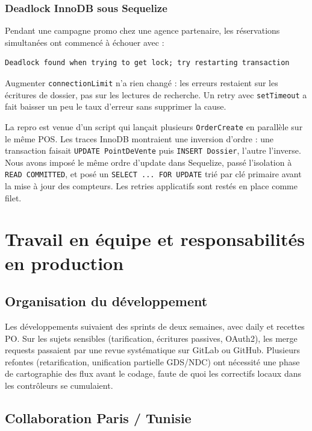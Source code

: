 \subsection{Deadlock InnoDB sous Sequelize}

Pendant une campagne promo chez une agence partenaire, les réservations simultanées ont commencé à échouer avec :
\begin{verbatim}
Deadlock found when trying to get lock; try restarting transaction
\end{verbatim}

Augmenter \texttt{connectionLimit} n'a rien changé : les erreurs restaient sur les écritures de dossier, pas sur les lectures de recherche. Un retry avec \texttt{setTimeout} a fait baisser un peu le taux d'erreur sans supprimer la cause.

La repro est venue d'un script qui lançait plusieurs \texttt{OrderCreate} en parallèle sur le même POS. Les traces InnoDB montraient une inversion d'ordre : une transaction faisait \texttt{UPDATE PointDeVente} puis \texttt{INSERT Dossier}, l'autre l'inverse. Nous avons imposé le même ordre d'update dans Sequelize, passé l'isolation à \texttt{READ COMMITTED}, et posé un \texttt{SELECT ... FOR UPDATE} trié par clé primaire avant la mise à jour des compteurs. Les retries applicatifs sont restés en place comme filet.

\chapter{Travail en équipe et responsabilités en production}
\label{chap:posture_professionnelle}

\section{Organisation du développement}

Les développements suivaient des sprints de deux semaines, avec daily et recettes PO. Sur les sujets sensibles (tarification, écritures passives, OAuth2), les merge requests passaient par une revue systématique sur GitLab ou GitHub. Plusieurs refontes (retarification, unification partielle GDS/NDC) ont nécessité une phase de cartographie des flux avant le codage, faute de quoi les correctifs locaux dans les contrôleurs se cumulaient.

\section{Collaboration Paris / Tunisie}

